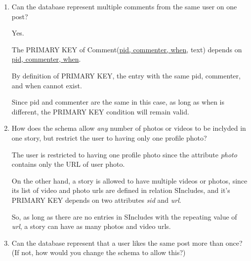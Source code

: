 \documentclass[12pt]{article}
\begin{document}
\begin{enumerate}[1.]
    \item Can the database represent multiple comments from the same user on one post?

    \bigskip

    \begin{mdframed}
        Yes.

        \bigskip

        The PRIMARY KEY of Comment(\ul{pid, commenter, when}, text)
        depends on \ul{pid, commenter, when}.

        \bigskip

        By definition of PRIMARY KEY, the entry with the same pid, commenter, and when cannot exist.

        \bigskip

        Since pid and commenter are the same in this case, as long as when is different,
        the PRIMARY KEY condition will remain valid.
    \end{mdframed}

    \item How does the schema allow \textit{any} number of photos or videos to be
    inclyded in one story, but restrict the user to having only one profile photo?

    \bigskip

    \begin{mdframed}

    The user is restricted to having one profile photo since the attribute
    \textit{photo} contains only the URL of user photo.

    \bigskip

    On the other hand, a story is allowed to have multiple videos or photos, since
    its list of video and photo urls are defined in relation SIncludes, and it's PRIMARY KEY
    depends on two attributes \textit{sid} and \textit{url}.

    \bigskip

    So, as long as there are no entries in SIncludes with the repeating value of
    \textit{url}, a story can have as many photos and video urls.
    \end{mdframed}

    \item Can the database represent that a user likes the same post more than once?
    (If not, how would you change the schema to allow this?)

    \bigskip

    \begin{mdframed}


\end{mdframed}
\end{enumerate}
\end{document}
